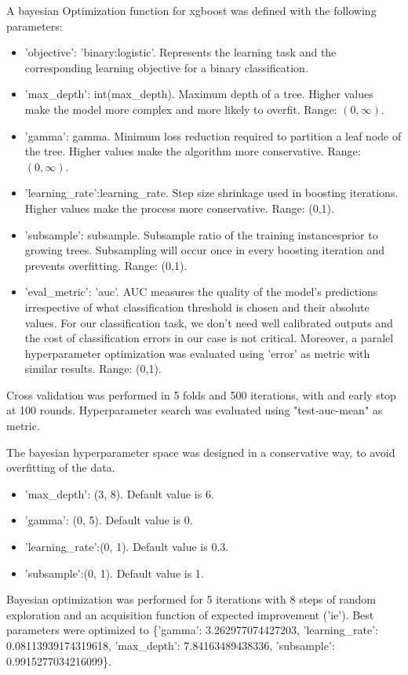 \documentclass{article}
\begin{document}
{\begin{itemize}
A bayesian Optimization function for xgboost was defined with the following parameters:
\begin{itemize}
	\item 'objective': 'binary:logistic'. Represents the learning task and the corresponding learning objective for a binary classification.
	\item 'max\_depth': int(max\_depth). Maximum depth of a tree. Higher values make the model more complex and more likely to overfit. Range: $(0, \infty)$.
	\item 'gamma': gamma. Minimum loss reduction required to partition a leaf node of the tree. Higher values make the algorithm more conservative. Range: $(0, \infty)$.
	\item'learning\_rate':learning\_rate. Step size shrinkage used in boosting iterations. Higher values make the process more conservative. Range: (0,1).
	\item 'subsample': subsample. Subsample ratio of the training instancesprior to growing trees. Subsampling will occur once in every boosting iteration and prevents overfitting. Range: (0,1).
	\item 'eval\_metric': 'auc'. AUC measures the quality of the model's predictions irrespective of what classification threshold is chosen and their absolute values. For our classification task, we don't need well calibrated outputs and the cost of classification errors in our case is not critical. Moreover, a paralel hyperparameter optimization was evaluated using 'error' as metric with similar results. Range: (0,1).

\end{itemize}

Cross validation was performed in 5 folds and 500 iterations, with and early stop at 100 rounds.
Hyperparameter search was evaluated using "test-auc-mean" as metric.

The bayesian hyperparameter space was designed in a conservative way, to avoid overfitting of the data.
\begin{itemize}
	\item 'max\_depth': (3, 8).  Default value is 6. 
	\item 'gamma': (0, 5). Default value is 0.
	\item 'learning\_rate':(0, 1). Default value is 0.3.
	\item 'subsample':(0, 1). Default value is 1.
\end{itemize}

Bayesian optimization was performed for 5 iterations with 8 steps of random exploration and an acquisition function of expected improvement ('ie'). Best parameters were optimized to \{'gamma': 3.262977074427203, 'learning\_rate': 0.08113939174319618, 'max\_depth': 7.84163489438336, 'subsample': 0.9915277034216099\}.


\end{itemize}}
\end{document}
